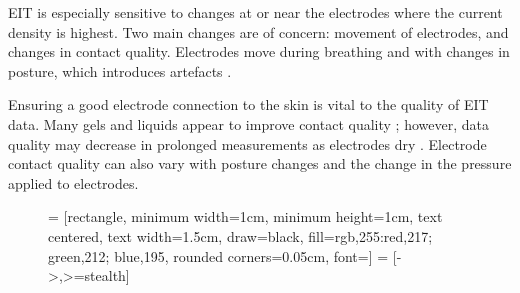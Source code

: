 \documentclass[12pt]{article} \usepackage[margin=3cm]{geometry} \usepackage[margin=20pt,font=small,labelfont=bf]{caption}\def\TBLWIDA{35mm}\def\TBLWIDB{95mm}
\begin{document}
EIT is especially sensitive to changes at or near the electrodes
where the current density is highest. Two main changes are of
concern: movement of electrodes, and changes in contact quality.
Electrodes move during breathing and with changes in posture,
which introduces artefacts \cite{Adler1996Expansion}.

Ensuring a good electrode connection to the skin is vital to 
the quality of EIT data. Many gels and liquids appear to
improve contact quality \cite{Waldmann2017Interface};
however, data quality may decrease in prolonged measurements 
as electrodes dry \cite{Lozano1995Prolonged}.
Electrode contact quality can also vary with
posture changes \cite{Coulombe2005Parametric} and the change in the
pressure applied to electrodes.


\begin{figure}[h]
    = [rectangle, minimum width=1cm, minimum height=1cm,
                      text centered, text width=1.5cm, draw=black, fill={rgb,255:red,217; green,212; blue,195},
   						 rounded corners=0.05cm,
                      font={\footnotesize\sffamily}]
    = [->,>=stealth]
	\centering


\end{figure}
\end{document}
